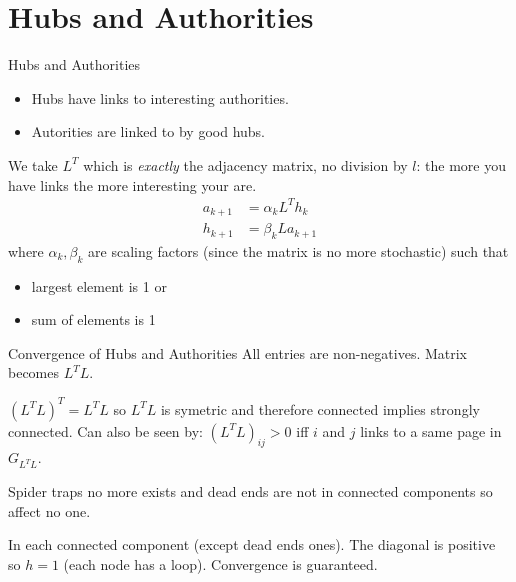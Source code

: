 \documentclass[10pt]{beamer}
\begin{document}
\section{Hubs and Authorities}
\begin{frame}
  \tableofcontents[currentsection]
\end{frame}
\begin{frame}{Hubs and Authorities}
  \begin{itemize}
    \item Hubs have links to interesting authorities.
    \item Autorities are linked to by good hubs.
  \end{itemize}
  We take $L^T$ which is \emph{exactly} the adjacency matrix, no division by $l$:
  the more you have links the more interesting your are.
  \begin{align*}
    a_{k+1} & = \alpha_k L^T h_k\\
    h_{k+1} & = \beta_k  L a_{k+1}
  \end{align*}
  where $\alpha_k, \beta_k$ are scaling factors (since the matrix is no more stochastic)
  such that
  \begin{itemize}
    \item largest element is 1 or
    \item sum of elements is 1
  \end{itemize}
\end{frame}

\begin{frame}{Convergence of Hubs and Authorities}
  All entries are non-negatives.
  Matrix becomes $L^TL$.

  $(L^TL)^T = L^TL$ so $L^TL$ is symetric and therefore connected implies strongly connected.
  Can also be seen by:
  $(L^TL)_{ij} > 0$ iff $i$ and $j$ links to a same page in $G_{L^TL}$.

  Spider traps no more exists and dead ends are not in connected components so affect no one.

  In each connected component (except dead ends ones).
  The diagonal is positive so $h = 1$ (each node has a loop).
  Convergence is guaranteed.
\end{frame}
\end{document}
